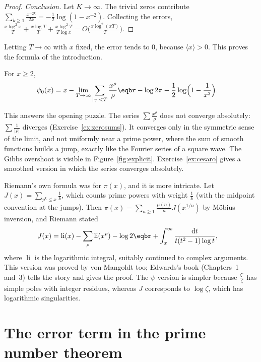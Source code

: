 \begin{proof}
\emph{Conclusion.} Let $K\to\infty$. The trivial zeros contribute $\sum_{k\ge1}\frac{x^{-2k}}{2k}=-\frac12\log(1-x^{-2})$. Collecting the errors, $\frac{x\log^2x}T+\frac{x\log T}T+\frac{x\log^2T}{T\log x}=O\bigl(\frac{x\log^2(xT)}T\bigr)$.
\end{proof}

Letting $T\to\infty$ with $x$ fixed, the error tends to $0$, because $\langle x\rangle>0$. This proves the formula of the introduction.

\begin{corollary}\label{cor:exactexplicit}
For $x\ge2$,
\[
\begin{aligned}\psi_0(x)&=x-\lim_{T\to\infty}\sum_{|\gamma|<T}\frac{x^\rho}\rho\eqbr-\log2\pi-\frac12\log\Bigl(1-\frac1{x^2}\Bigr).\end{aligned}
\]
\end{corollary}

This answers the opening puzzle. The series $\sum\frac{x^\rho}\rho$ does not converge absolutely: $\sum\frac1{|\rho|}$ diverges (Exercise~\ref{ex:zerosums}). It converges only in the symmetric sense of
the limit, and not uniformly near a prime power, where the sum of smooth functions builds a jump, exactly like the Fourier series of a square wave. The Gibbs overshoot is
visible in Figure~\ref{fig:explicit}. Exercise~\ref{ex:cesaro} gives a smoothed version in which the series converges absolutely.

\begin{remark}
Riemann's own formula was for $\pi(x)$, and it is more intricate. Let $J(x)=\sum_{p^k\le x}\frac1k$, which counts prime powers with weight $\frac1k$ (with the midpoint convention at the jumps). Then
$\pi(x)=\sum_{n\ge1}\frac{\mu(n)}nJ(x^{1/n})$ by Möbius inversion, and Riemann stated
\[
\begin{aligned}J(x)&=\operatorname{li}(x)-\sum_\rho\operatorname{li}(x^\rho)-\log2\eqbr+\int_x^\infty\frac{\mathrm dt}{t(t^2-1)\log t},\end{aligned}
\]
where $\operatorname{li}$ is the logarithmic integral, suitably continued to complex arguments. This version was proved by von Mangoldt too; Edwards's book (Chapters~1 and~3) tells the story and gives the
proof. The $\psi$ version is simpler because $\frac{\zeta'}\zeta$ has simple poles with integer residues, whereas $J$ corresponds to $\log\zeta$, which has logarithmic singularities.
\end{remark}

\section{The error term in the prime number theorem}

